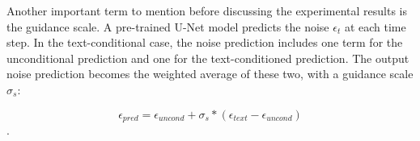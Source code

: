 Another important term to mention before discussing the experimental results is the guidance scale. A pre-trained U-Net model predicts the noise $\epsilon_t$ at each time step. In the text-conditional case, the noise prediction includes one term for the unconditional prediction and one for the text-conditioned prediction. The output noise prediction becomes the weighted average of these two, with a guidance scale $\sigma_s$:

$$\epsilon_{pred} = \epsilon_{uncond} + \sigma_s * (\epsilon_{text} - \epsilon_{uncond} )$$.

